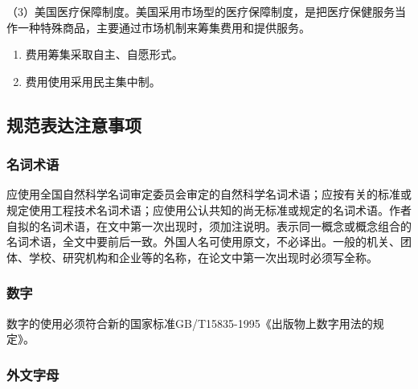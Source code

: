 （3）美国医疗保障制度。美国采用市场型的医疗保障制度，是把医疗保健服务当作一种特殊商品，主要通过市场机制来筹集费用和提供服务。

\begin{enumerate}[label=\textcircled{\footnotesize\arabic*}]
  \item{费用筹集采取自主、自愿形式。}
  \item{费用使用采用民主集中制。}
\end{enumerate}


\subsection{规范表达注意事项}

\subsubsection{名词术语}

应使用全国自然科学名词审定委员会审定的自然科学名词术语；应按有关的标准或规定使用工程技术名词术语；应使用公认共知的尚无标准或规定的名词术语。作者自拟的名词术语，在文中第一次出现时，须加注说明。表示同一概念或概念组合的名词术语，全文中要前后一致。外国人名可使用原文，不必译出。一般的机关、团体、学校、研究机构和企业等的名称，在论文中第一次出现时必须写全称。

\subsubsection{数字}

数字的使用必须符合新的国家标准GB/T15835-1995《出版物上数字用法的规定》。

\subsubsection{外文字母}

